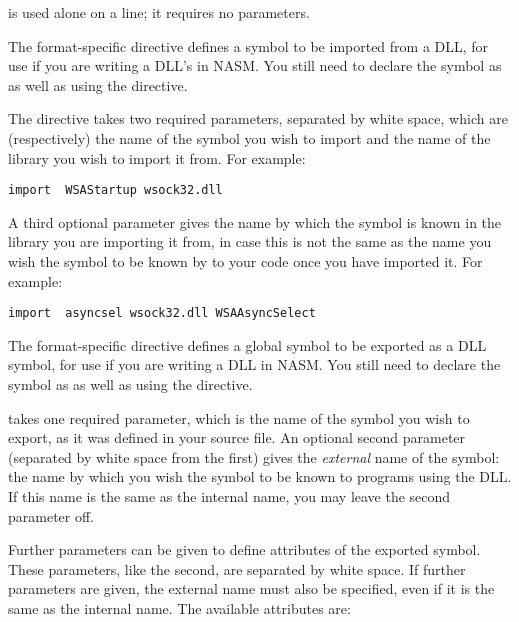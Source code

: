  is used alone on a line; it requires no parameters.


The  format-specific directive defines a symbol to be
imported from a DLL, for use if you are writing a DLL's
 in NASM. You still need to declare the
symbol as  as well as using the 
directive.

The  directive takes two required parameters, separated
by white space, which are (respectively) the name of the symbol you
wish to import and the name of the library you wish to import it
from. For example:

\begin{lstlisting}
import  WSAStartup wsock32.dll
\end{lstlisting}

A third optional parameter gives the name by which the symbol is
known in the library you are importing it from, in case this is not
the same as the name you wish the symbol to be known by to your code
once you have imported it. For example:

\begin{lstlisting}
import  asyncsel wsock32.dll WSAAsyncSelect
\end{lstlisting}


The  format-specific directive defines a global
symbol to be exported as a DLL symbol, for use if you are
writing a DLL in NASM. You still need to declare the symbol
as  as well as using the  directive.

 takes one required parameter, which is the name of the
symbol you wish to export, as it was defined in your source file. An
optional second parameter (separated by white space from the first)
gives the \emph{external} name of the symbol: the name by which you
wish the symbol to be known to programs using the DLL. If this name
is the same as the internal name, you may leave the second parameter
off.

Further parameters can be given to define attributes of the exported
symbol. These parameters, like the second, are separated by white
space. If further parameters are given, the external name must also
be specified, even if it is the same as the internal name. The
available attributes are:

